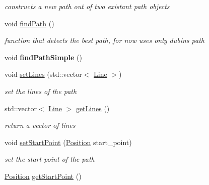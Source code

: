 \begin{DoxyCompactItemize}
\begin{DoxyCompactList}\small\item\em constructs a new path out of two existant path objects \end{DoxyCompactList}\item 
\mbox{\label{class_path2_d_1_1_path_a50fcaf16012fb0bdc3054bfa2f2af09e}} 
void \mbox{\hyperlink{class_path2_d_1_1_path_a50fcaf16012fb0bdc3054bfa2f2af09e}{find\+Path}} ()
\begin{DoxyCompactList}\small\item\em function that detects the best path, for now uses only dubins path \end{DoxyCompactList}\item 
\mbox{\label{class_path2_d_1_1_path_a6ded1282950f7fc212833c114720c68f}} 
void {\bfseries find\+Path\+Simple} ()
\item 
\mbox{\label{class_path2_d_1_1_path_a695ce11815d37ed6a5aba1ee5db679e5}} 
void \mbox{\hyperlink{class_path2_d_1_1_path_a695ce11815d37ed6a5aba1ee5db679e5}{set\+Lines}} (std\+::vector$<$ \mbox{\hyperlink{class_path2_d_1_1_element_1_1_line}{Line}} $>$)
\begin{DoxyCompactList}\small\item\em set the lines of the path \end{DoxyCompactList}\item 
std\+::vector$<$ \mbox{\hyperlink{class_path2_d_1_1_element_1_1_line}{Line}} $>$ \mbox{\hyperlink{class_path2_d_1_1_path_a8961bcc1f2c03640028e181c4d7af163}{get\+Lines}} ()
\begin{DoxyCompactList}\small\item\em return a vector of lines \end{DoxyCompactList}\item 
void \mbox{\hyperlink{class_path2_d_1_1_path_a7e21bacbade3e302c5db5499cee1428f}{set\+Start\+Point}} (\mbox{\hyperlink{class_path2_d_1_1_element_1_1_position}{Position}} start\+\_\+point)
\begin{DoxyCompactList}\small\item\em set the start point of the path \end{DoxyCompactList}\item 
\mbox{\hyperlink{class_path2_d_1_1_element_1_1_position}{Position}} \mbox{\hyperlink{class_path2_d_1_1_path_acf811e8439f1e603050b74b34acd6814}{get\+Start\+Point}} ()

\end{DoxyCompactItemize}
